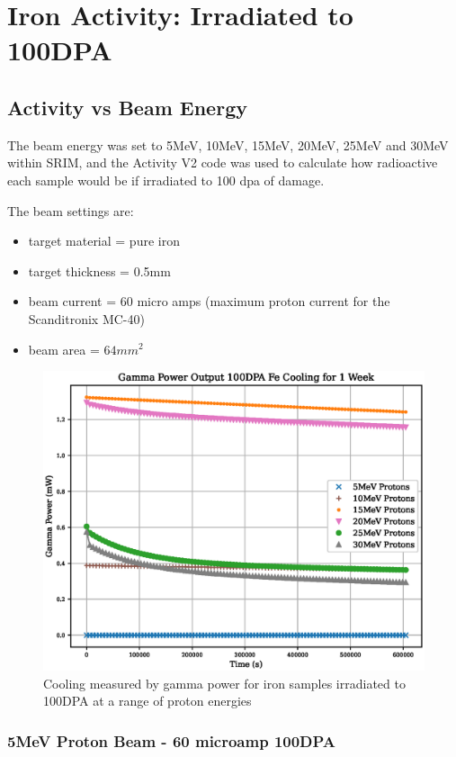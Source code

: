 \chapter{Iron Activity: Irradiated to 100DPA}
\label{chap:appendixironactivity}

\section{Activity vs Beam Energy}

The beam energy was set to 5MeV, 10MeV, 15MeV, 20MeV, 25MeV and 30MeV within SRIM, and the Activity V2 code was used to calculate how radioactive each sample would be if irradiated to 100 \acrshort{dpa} of damage.

The beam settings are:

\begin{itemize}
\item target material = pure iron
\item target thickness = 0.5mm
\item beam current = 60 micro amps (maximum proton current for the Scanditronix MC-40)
\item beam area = $64mm^2$
\end{itemize}



\begin{figure}[!htb]
\centering
\includegraphics[width=0.7\linewidth]{chapters/activity_code/fe_100dpa/cooling.eps}
\caption{Cooling measured by gamma power for iron samples irradiated to 100DPA at a range of proton energies}
\label{fig:100dpa-cooling}
\end{figure}



\clearpage
\FloatBarrier
\subsection{5MeV Proton Beam - 60 microamp 100DPA}

